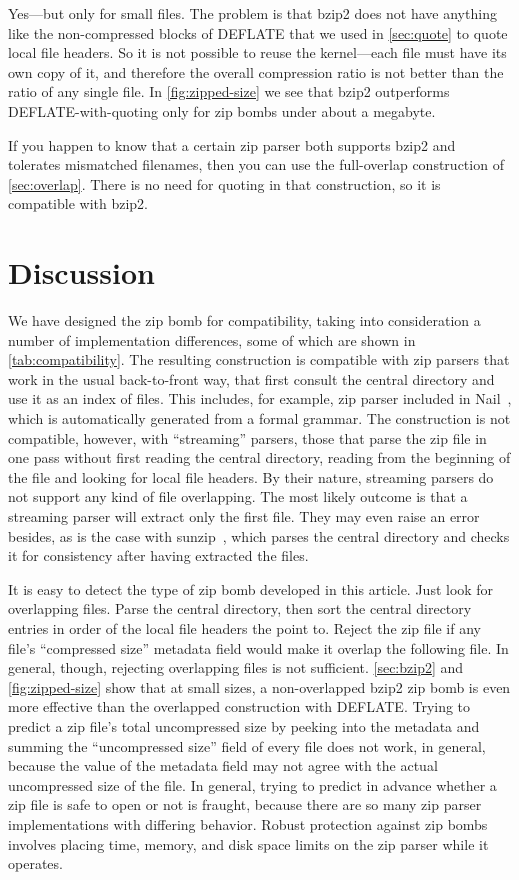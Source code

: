 \documentclass[letterpaper,twocolumn,10pt]{article}
\begin{document}
Yes---but only for small files.
The problem is that bzip2 does not have anything like the
non-compressed blocks of DEFLATE
that we used in \autoref{sec:quote} to quote local file headers.
So it is not possible to reuse the kernel---each file must have
its own copy of it, and therefore the overall compression ratio
is not better than the ratio of any single file.
In \autoref{fig:zipped-size} we see that
bzip2 outperforms DEFLATE-with-quoting
only for zip bombs under about a megabyte.

If you happen to know that a certain zip parser both supports bzip2
and tolerates mismatched filenames,
then you can use the full-overlap construction of \autoref{sec:overlap}.
There is no need for quoting in that construction,
so it is compatible with bzip2.


\section{Discussion}
\label{sec:discussion}

We have designed the zip bomb for compatibility,
taking into consideration a number of implementation differences,
some of which are shown in \autoref{tab:compatibility}.
The resulting construction is compatible with zip parsers that work
in the usual back-to-front way,
that first consult the central directory
and use it as an index of files.
This includes, for example,
zip parser included in Nail~\cite{186219},
which is automatically generated from a formal grammar.
The construction is not compatible, however,
with ``streaming'' parsers,
those that parse the zip file in one pass
without first reading the central directory,
reading from the beginning of the file and looking for local file headers.
By their nature, streaming parsers
do not support any kind of file overlapping.
The most likely outcome is that a streaming parser
will extract only the first file.
They may even raise an error besides,
as is the case with \mbox{sunzip}~\cite{sunzip},
which parses the central directory and checks it for consistency
after having extracted the files.

It is easy to detect the type of zip bomb
developed in this article.
Just look for overlapping files.
Parse the central directory,
then sort the central directory entries
in order of the local file headers the point to.
Reject the zip file if any file's ``compressed size''
metadata field would make it overlap the following file.
In general, though, rejecting overlapping files is not sufficient.
\autoref{sec:bzip2} and \autoref{fig:zipped-size}
show that at small sizes, a non-overlapped bzip2 zip bomb
is even more effective than
the overlapped construction with DEFLATE.
Trying to predict a zip file's total uncompressed size
by peeking into the metadata and summing
the ``uncompressed size'' field of every file
does not work, in general,
because the value of the metadata field
may not agree with the actual uncompressed size of the file.
In general, trying to predict in advance whether a zip file
is safe to open or not is fraught,
because there are so many zip parser implementations
with differing behavior.
Robust protection against zip bombs
involves placing time, memory, and disk space limits
on the zip parser while it operates.
\end{document}
